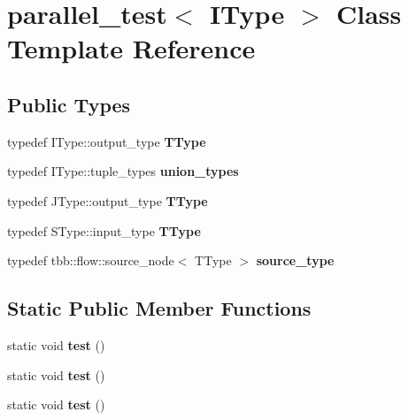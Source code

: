 \hypertarget{classparallel__test}{}\section{parallel\+\_\+test$<$ I\+Type $>$ Class Template Reference}
\label{classparallel__test}
\subsection*{Public Types}
\begin{DoxyCompactItemize}
\item 
\hypertarget{classparallel__test_ac1f9672526a9e5cf49cac8bc2de0d26a}{}typedef I\+Type\+::output\+\_\+type {\bfseries T\+Type}\label{classparallel__test_ac1f9672526a9e5cf49cac8bc2de0d26a}

\item 
\hypertarget{classparallel__test_adb2d55056d647aa89d71c5b1cac861c1}{}typedef I\+Type\+::tuple\+\_\+types {\bfseries union\+\_\+types}\label{classparallel__test_adb2d55056d647aa89d71c5b1cac861c1}

\item 
\hypertarget{classparallel__test_abe6599da2d66f60f3d9d0ee217ee5363}{}typedef J\+Type\+::output\+\_\+type {\bfseries T\+Type}\label{classparallel__test_abe6599da2d66f60f3d9d0ee217ee5363}

\item 
\hypertarget{classparallel__test_a7716904421ff2fd8b9110f21c3c6518c}{}typedef S\+Type\+::input\+\_\+type {\bfseries T\+Type}\label{classparallel__test_a7716904421ff2fd8b9110f21c3c6518c}

\item 
\hypertarget{classparallel__test_ae7ba1b61a2bf2a1f264155770992bf60}{}typedef tbb\+::flow\+::source\+\_\+node$<$ T\+Type $>$ {\bfseries source\+\_\+type}\label{classparallel__test_ae7ba1b61a2bf2a1f264155770992bf60}

\end{DoxyCompactItemize}
\subsection*{Static Public Member Functions}
\begin{DoxyCompactItemize}
\item 
\hypertarget{classparallel__test_ac921a1aee8b001150e20c269f2c9b701}{}static void {\bfseries test} ()\label{classparallel__test_ac921a1aee8b001150e20c269f2c9b701}

\item 
\hypertarget{classparallel__test_ac921a1aee8b001150e20c269f2c9b701}{}static void {\bfseries test} ()\label{classparallel__test_ac921a1aee8b001150e20c269f2c9b701}

\item 
\hypertarget{classparallel__test_ac921a1aee8b001150e20c269f2c9b701}{}static void {\bfseries test} ()\label{classparallel__test_ac921a1aee8b001150e20c269f2c9b701}

\end{DoxyCompactItemize}
